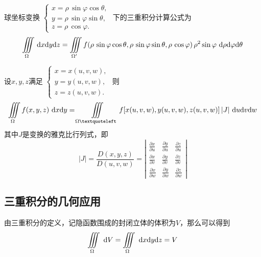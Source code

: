 \ttheorem[球坐标变换]
球坐标变换
$
\begin{cases}
x =\rho \,\sin \varphi \cos \theta,\\
y = \rho \,\sin \varphi \sin \theta ,\\
z = \rho \,\cos \varphi .
\end{cases}
$
下的三重积分计算公式为
\begin{equation}
\iiint\limits_{\Omega} \,{\rm{d}} x {\rm{d}} y  {\rm{d}} z = \iiint\limits_{\Omega'} f(\rho \,\sin \varphi \cos \theta,\rho \,\sin \varphi \sin \theta , \rho \,\cos \varphi)\, \rho^2 \sin \varphi \,\,{\rm{d}} \rho {\rm{d}} \varphi  {\rm{d}} \theta 
\end{equation}

\ttheorem[一般变换]
设$x,y,z$满足
$
\begin{cases}
x = x(u,v,w),\\
y = y(u,v,w), \\
z = z(u,v,w).
\end{cases}
$
则
\begin{equation}
\iiint\limits_{\Omega }f(x,y,z)\,\, \d x \d y= \iiint\limits_{\Omega‘}f[x(u,v,w),y(u,v,w),z(u,v,w)]\,|J|\, \,\d u \d v \d w
\end{equation}
其中$J$是变换的雅克比行列式，即
\renewcommand{\arraystretch}{1.5}
\begin{equation*}
|J|=\frac{D(x,y,z)}{D(u,v,w)}=
\left| 
\begin{array}{ccc}
\displaystyle \frac{\partial x}{\partial u} & \displaystyle \frac{\partial y}{\partial u} & \displaystyle \frac{\partial z}{\partial u} \\
\displaystyle \frac{\partial x}{\partial v} & \displaystyle \frac{\partial y}{\partial v} & \displaystyle \frac{\partial z}{\partial v} \\
\displaystyle \frac{\partial x}{\partial w} & \displaystyle \frac{\partial y}{\partial w} & \displaystyle \frac{\partial z}{\partial w} 
\end{array}
\right| 
\end{equation*}
\renewcommand{\arraystretch}{1}


\subsection{三重积分的几何应用}
\sj
\example[求立体的体积]
由三重积分的定义，记隐函数围成的封闭立体的体积为$V$，那么可以得到
\begin{equation}
\iiint\limits_{\Omega} \, \, {\rm{d}} V=\iiint\limits_{\Omega}\, \, {\rm{d}} x {\rm{d}} y {\rm{d}} z=V
\end{equation}